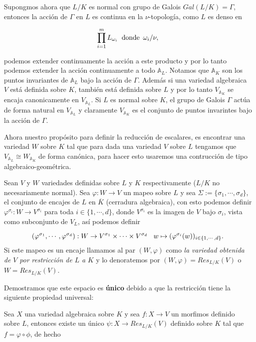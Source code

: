 \documentclass[letterpaper]{report}
\newcommand{\Ad}{\ensuremath{\mathbb{A}}}
\newcommand{\ga}{\ensuremath{\Gamma}}
\begin{document}
Supongmos ahora que $L/K$ es normal con grupo de Galois $Gal(L/K)=\ga$, entonces la acción de $\ga$ en $L$ es continua en la $\nu$-topología, como $L$ es denso en 

$$\prod^m_{i=1}L_{\omega_i}\hspace{0.2cm}\text{donde}\,\,\,\omega_i/\nu,$$

\noindent podemos extender continuamente la acción a este producto y por lo tanto podemos extender la acción continuamente a todo $\Ad_{L}$. Notamos que $\Ad_K$ son los puntos invariantes de $\Ad_{L}$ bajo la acción de $\ga$. Además si una variedad algebraica $V$ está definida sobre $K$, también está definida sobre $L$ y por lo tanto $V_{\Ad_K}$ se encaja canonicamente en $V_{\Ad_{L}}$. Si $L$ es normal sobre $K$, el grupo de Galois $\ga$ actúa de forma natural en $V_{\Ad_{L}}$ y claramente $V_{\Ad_K}$ es el conjunto de puntos invarintes bajo la acción de $\ga$.

Ahora nuestro propósito para definir la reducción de escalares, es encontrar una variedad $W$ sobre $K$ tal que para dada una variedad $V$ sobre $L$ tengamos que $V_{\Ad_L}\cong W_{\Ad_K}$ de forma canónica, para hacer esto usaremos una contrucción de tipo algebraico-geométrica.

Sean $V$ y $W$ variedades definidas sobre $L$ y $K$ respectivamente ($L/K$ no necesariamente normal). Sea $\varphi:W\rightarrow V$ un mapeo sobre $L$ y sea $\Sigma:=\lbrace\sigma_1,\cdots,\sigma_d\rbrace$, el conjunto de encajes de $L$ en $\overline{K}$ (cerradura algebraica), con esto podemos definir $\varphi^{\sigma_i}:W\rightarrow V^{\sigma_i}$ para toda $i\in\lbrace 1,\cdots,d\rbrace$, donde $V^{\sigma_i}$ es la imagen de $V$ bajo $\sigma_i$, vista como subconjunto de $V_L$, así podemos definir

$$
	(\varphi^{\sigma_1},\cdots,\varphi^{\sigma_d}):W\rightarrow V^{\sigma_1}\times\cdots\times V^{\sigma_d}
		\hspace{0.3cm}
			w\mapsto(\varphi^{\sigma_i}(w))_{i\in\lbrace 1,\cdots,d\rbrace}.
$$
Si este mapeo es un encaje llamamos al par $(W,\varphi)$ como \textit{la variedad obtenida de $V$ por restricción de $L$ a $K$} y lo denoratemos por $(W,\varphi)=Res_{L/K}(V)$ o $W=Res_{L/K}(V)$.

Demostramos que este espacio es \textbf{único} debido a que la restricción tiene la siguiente propiedad universal:

Sea $X$ una variedad algebraica sobre $K$ y sea $f:X\rightarrow V$ un morfimos definido sobre $L$, entonces existe un único $\psi:X\rightarrow Res_{L/K}(V)$ definido sobre $K$ tal que $f=\varphi\circ\phi$, de hecho
\end{document}
